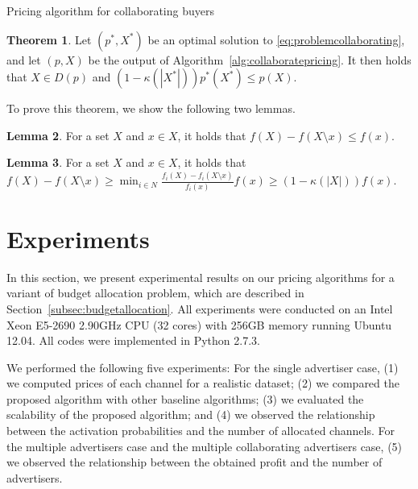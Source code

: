 \documentclass[letterpaper]{article}
\theoremstyle{definition}
\newtheorem{theorem}{Theorem}
\newtheorem{lemma}[theorem]{Lemma}
\begin{document}
\begin{algorithm}[tb]
\caption{Pricing algorithm for collaborating buyers}
\label{alg:collaboratepricing}
\begin{algorithmic}
\end{algorithmic}
\end{algorithm}

\begin{theorem}\label{thm:collaborating}
Let $(p^*, X^*)$ be an optimal solution to \eqref{eq:problemcollaborating},
and let $(p, X)$ be the output of Algorithm~\ref{alg:collaboratepricing}.
It then holds that \(X\in D(p)\) and
\((1 - \kappa(|X^*|)) p^*(X^*) \le p(X)\).
\end{theorem}

To prove this theorem, we show the following two lemmas.
\begin{lemma}\label{lem:collaborating 1}
For a set $X$ and $x\in X$, it holds that
$ f(X) - f(X \setminus x) \le f(x)$. %
\end{lemma}

\begin{lemma}\label{lem:collaborating 2}
For a set $X$ and $x\in X$, it holds that
$f(X) - f(X \setminus x) \ge \min_{i\in N}\frac{f_i(X)-f_i(X\setminus x)}{f_i(x)}f(x)
\ge (1 - \kappa(|X|)) f(x)$.
\end{lemma}


\section{Experiments}
\label{sec:experiments}

In this section, we present experimental results on our pricing algorithms
for a variant of budget allocation problem, which are described in Section~\ref{subsec:budgetallocation}.
All experiments were conducted on an Intel Xeon E5-2690
2.90GHz CPU (32 cores) with 256GB memory running Ubuntu 12.04.
All codes were implemented in Python 2.7.3.

We performed the following five experiments:
For the single advertiser case,
(1) we computed prices of each channel for a realistic dataset;
(2) we compared the proposed algorithm with other baseline algorithms;
(3) we evaluated the scalability of the proposed algorithm; and
(4) we observed the relationship between the activation probabilities and the number of allocated channels. %
For the multiple advertisers case and the multiple collaborating advertisers case,
(5) we observed the relationship between the obtained profit and the number of advertisers.
\end{document}
